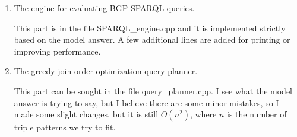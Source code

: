 \documentclass{article}
\begin{document}
\begin{enumerate}
\begin{enumerate}
3) To match the patterns like $\langle X, Y, Z\rangle$, the paper suggests to iterate over the triple table; if we want $X = Y$,  we skip those $X\neq Y$. I modify this a little bit to improve the efficiency. Again, $\langle X, X, Z\rangle$, for example, we first iterate $I_s$, and for each $s$ in $I_s$, we find if $I_{sp}$ includes hash($s, s$), if yes, we traverse over the triple table. As shown in the pseudo-code in Algorithm \eqref{alg:evaluateXXP}\footnote{The actual implementation is slightly different. I put the check of if $i$ in $I_{sp}$ at the beginning of the Evaluate\_SPZ to reduce some code redundancy, but they are equivalent.}.

\begin{algorithm}[H]
\caption{Evaluate $\langle X, X, Z\rangle$}\label{alg:evaluateXXP}
\begin{algorithmic}
\State $i = $ hash($s, s$)
\State Evaluate\_SPZ($s, s$)
\EndIf
\EndFor
\end{algorithmic}
\end{algorithm}

$\langle X, Y, Y\rangle$ and $\langle X, Y, X\rangle$ are similar. For $\langle X, X, X\rangle$, we only need to traverse  $s$ in $I_s$ and find if $\langle s, s, s\rangle$ is in $I_{spo}$ as shown in  Algorithm \eqref{alg:evaluateXXX}.

\begin{algorithm}[H]
\caption{Evaluate $\langle X, X, X\rangle$}\label{alg:evaluateXXX}
\begin{algorithmic}
\State Evaluate\_SPO($s, s, s$) 
\EndFor
\end{algorithmic}
\end{algorithm}

\item The engine for evaluating BGP SPARQL queries.

This part is in the file SPARQL\_engine.cpp and it is implemented strictly based on the model answer. A few additional lines are added for printing or improving performance.

\item The greedy join order optimization query planner.

This part can be sought in the file query\_planner.cpp. I see what the model answer is trying to say, but I believe there are some minor mistakes, so I made some slight changes, but it is still $O(n^2)$, where $n$ is the number of triple patterns we try to fit. 


\end{enumerate}
\end{enumerate}
\end{document}
